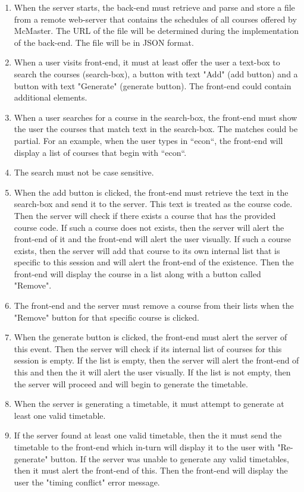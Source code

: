 \documentclass[12pt]{article}
\begin{document}
\begin{enumerate}
    \item When the server starts, the back-end must retrieve and parse and store a file from a remote web-server that contains the schedules of all courses offered by McMaster. The URL of the file will be determined during the implementation of the back-end. The file will be in JSON format.
    \item When a user visits front-end, it must at least offer the user a text-box to search the courses (search-box), a button with text "Add" (add button) and a button with text "Generate" (generate button). The front-end could contain additional elements.
    \item When a user searches for a course in the search-box, the front-end must show the user the courses that match text in the search-box. The matches could be partial. For an example, when the user types in ``econ``, the front-end will display a list of courses that begin with ``econ``.
    \item The search must not be case sensitive.
    \item When the add button is clicked, the front-end must retrieve the text in the search-box and send it to the server. This text is treated as the course code. Then the server will check if there exists a course that has the provided course code. If such a course does not exists, then the server will alert the front-end of it and the front-end will alert the user visually. If such a course exists, then the server will add that course to its own internal list that is specific to this session and will alert the front-end of the existence. Then the front-end will display the course in a list along with a button called "Remove".
    \item The front-end and the server must remove a course from their lists when the "Remove" button for that specific course is clicked.
    \item When the generate button is clicked, the front-end must alert the server of this event. Then the server will check if its internal list of courses for this session is empty. If the list is empty, then the server will alert the front-end of this and then the it will alert the user visually. If the list is not empty, then the server will proceed and will begin to generate the timetable.
    \item When the server is generating a timetable, it must attempt to generate at least one valid timetable.
    \item If the server found at least one valid timetable, then the it must send the timetable to the front-end which in-turn will display it to the user with "Re-generate" button. If the server was unable to generate any valid timetables, then it must alert the front-end of this. Then the front-end will display the user the "timing conflict" error message.

\end{enumerate}
\end{document}
